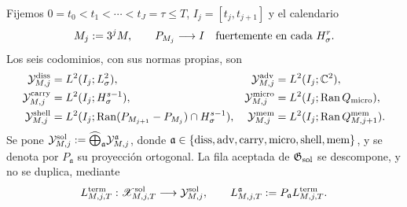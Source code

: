 Fijemos $0=t_0<t_1<\cdots<t_J=\tau\le T$, $I_j=[t_j,t_{j+1}]$ y el calendario
\begin{equation}\label{eq:pdf2-ns-cutoff-calendar}
 M_j:=3^jM,
 \qquad P_{M_j}\longrightarrow I
 \quad\hbox{fuertemente en cada }H^r_\sigma.
\end{equation}
Los seis codominios, con sus normas propias, son
\begin{equation}\label{eq:pdf2-ns-six-loss-spaces}
 \begin{aligned}
 \mathcal Y_{M,j}^{\rm diss}&=L^2(I_j;L^2_\sigma),&
 \mathcal Y_{M,j}^{\rm adv}&=L^2(I_j;\mathbb C^2),\\
 \mathcal Y_{M,j}^{\rm carry}&=L^2(I_j;H^{s-1}_\sigma),&
 \mathcal Y_{M,j}^{\rm micro}&=L^2(I_j;\operatorname{Ran}Q_{\rm micro}),\\
 \mathcal Y_{M,j}^{\rm shell}
 &=L^2(I_j;\operatorname{Ran}(P_{M_{j+1}}-P_{M_j})\cap H^{s-1}_\sigma),&
 \mathcal Y_{M,j}^{\rm mem}
 &=L^2(I_j;\operatorname{Ran}Q^{\rm mem}_{M,j+1}).
 \end{aligned}
\end{equation}
Se pone
$\mathcal Y_{M,j}^{\rm sol}:=\widehat\bigoplus_{\mathfrak a}
\mathcal Y_{M,j}^{\mathfrak a}$, donde
$\mathfrak a\in\{{\rm diss,adv,carry,micro,shell,mem}\}$, y se denota por
$P_{\mathfrak a}$ su proyección ortogonal. La fila aceptada de
$\mathfrak G_{\rm sol}$ se descompone, y no se duplica, mediante
\begin{equation}\label{eq:pdf2-ns-loss-parseval}
 L_{M,j,T}^{\rm term}:
 \mathscr X_{M,j,T}^{\rm sol}\longrightarrow\mathcal Y_{M,j}^{\rm sol},
 \qquad
 L_{M,j,T}^{\mathfrak a}:=P_{\mathfrak a}L_{M,j,T}^{\rm term}.
\end{equation}

